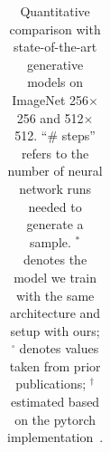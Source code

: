 \begin{table}[h]
{\begin{tabular}{lc ccc ccc ccc cc}
    \end{tabular}
    }
    \vspace{-5pt}
    \caption{Quantitative comparison with state-of-the-art generative models on ImageNet 256$\times$256 and 512$\times$512. 
    \footnotesize{``\# steps” refers to the number of neural network runs needed to generate a sample.  $^\ast$ denotes the model we train with the same architecture and setup with ours; $^\square$ denotes values taken from prior publications;  $^\dagger$ estimated based on the pytorch implementation~\cite{pytorch2020vqvae2}.} 
    }
    \label{tab:maintable}

\end{table}




